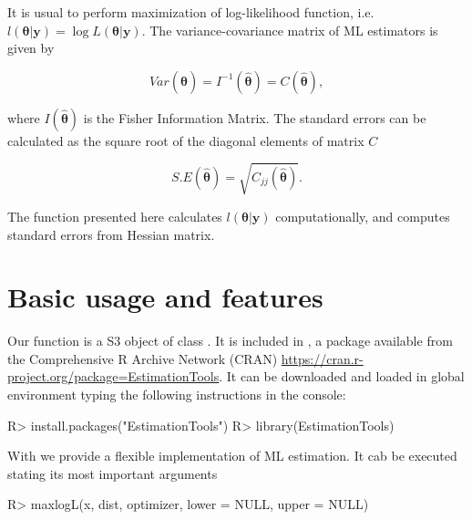 \documentclass[nojss]{jss}
\begin{document}
It is usual to perform maximization of log-likelihood function, i.e. $l(\boldsymbol{\theta}|\bm{y})=\log L(\boldsymbol{\theta}|\bm{y})$. The variance-covariance matrix of ML estimators is given by

\begin{equation}
Var(\hat{\boldsymbol{\theta}}) = I^{-1}(\hat{\boldsymbol{\theta}}) = C(\hat{\boldsymbol{\theta}}),
\end{equation}

where $I(\hat{\boldsymbol{\theta}})$ is the Fisher Information Matrix. The standard errors can be calculated as the square root of the diagonal elements of matrix $C$ \citep{Pawitan2013}%

\begin{equation}
S.E(\hat{\boldsymbol{\theta}}) = \sqrt{C_{jj}(\hat{\boldsymbol{\theta}})}.
\end{equation}

The  function presented here calculates $l(\boldsymbol{\theta}|\bm{y})$ computationally, and computes standard errors from Hessian matrix.

\section{Basic usage and features}

Our  function is a S3 object of class . It is included in , a package available from the Comprehensive R Archive Network (CRAN) \url{https://cran.r-project.org/package=EstimationTools}. It can be downloaded and loaded in global environment typing the following instructions in the console:

\begin{Schunk}
\begin{Sinput}
R> install.packages("EstimationTools")
R> library(EstimationTools)
\end{Sinput}
\end{Schunk}

With  we provide a flexible implementation of ML estimation. It cab be executed stating its most important arguments

\begin{Schunk}
\begin{Sinput}
R> maxlogL(x, dist, optimizer, lower = NULL, upper = NULL)
\end{Sinput}
\end{Schunk}
\end{document}
